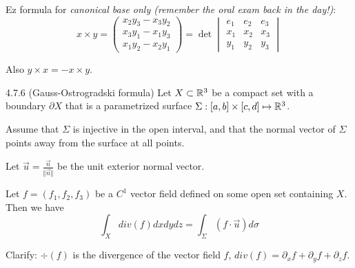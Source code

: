 Ez formula for \textit{canonical base only (remember the oral exam back in the day!)}:
\[
    x \times y = \begin{pmatrix}
        x_2y_3 - x_3y_2\\
        x_3y_1 - x_1 y_3\\
        x_1 y_2 - x_2 y_1
\end{pmatrix}
=
\det \begin{vmatrix}
    e_1 & e_2 & e_3\\
    x_1 & x_2 & x_3 \\
    y_1 & y_2 & y_3
\end{vmatrix}
\]

Also $y \times x = -x \times y$.

\begin{theorem}{4.7.6 (Gauss-Ostrogradski formula)}
    Let $X \subset \mathbb{R}^3$ be a compact set with a boundary $\partial X$ that is a parametrized surface $\Sigma: [a,b] \times [c,d] \mapsto \mathbb{R}^3$.

    Assume that $\Sigma$ is injective in the open interval, and that the normal vector of $\Sigma$ points away from the surface at all points.

    Let $\vec u = \frac{\vec n}{\Vert \vec n \Vert }$ be the unit exterior normal vector.

    Let $f = (f_1, f_2, f_3)$ be a $C^1$ vector field defined on some open set containing $X$. Then we have
    \[ \int_X div(f) dx dy dz = \int_\Sigma (f \cdot \vec u) d\sigma \]

    Clarify: $\div(f)$ is the divergence of the vector field $f$, $div(f) = \partial_x f + \partial_y f + \partial_z f$.
\end{theorem}